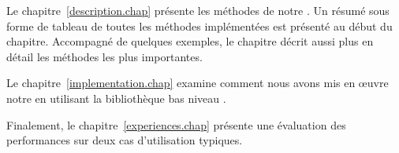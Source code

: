 \begin{introduction}
Le chapitre~\ref{description.chap}  pr\'esente les m\'ethodes de notre . Un r\'esum\'e sous forme de tableau de toutes les m\'ethodes implément\'ees est pr\'esent\'e au d\'ebut du chapitre. Accompagn\'e de quelques exemples, le chapitre d\'ecrit aussi plus en d\'etail les m\'ethodes les plus importantes.

Le chapitre~\ref{implementation.chap}  examine comment nous avons mis en œuvre notre  en utilisant la biblioth\`eque bas niveau .

Finalement, le chapitre~\ref{experiences.chap}  pr\'esente une \'evaluation des performances sur deux cas d'utilisation typiques.

\end{introduction}

